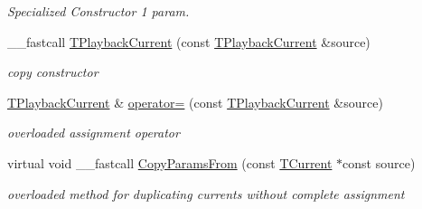 \begin{DoxyCompactItemize}
\begin{DoxyCompactList}\small\item\em Specialized Constructor 1 param. \end{DoxyCompactList}\item 
\hypertarget{class_t_playback_current_a4c38c5735ae6c69d88cab0daab923aec}{\+\_\+\+\_\+fastcall \hyperlink{class_t_playback_current_a4c38c5735ae6c69d88cab0daab923aec}{T\+Playback\+Current} (const \hyperlink{class_t_playback_current}{T\+Playback\+Current} \&source)}\label{class_t_playback_current_a4c38c5735ae6c69d88cab0daab923aec}

\begin{DoxyCompactList}\small\item\em copy constructor \end{DoxyCompactList}\item 
\hypertarget{class_t_playback_current_a24965d14280902d0f3ae98445dcef29f}{\hyperlink{class_t_playback_current}{T\+Playback\+Current} \& \hyperlink{class_t_playback_current_a24965d14280902d0f3ae98445dcef29f}{operator=} (const \hyperlink{class_t_playback_current}{T\+Playback\+Current} \&source)}\label{class_t_playback_current_a24965d14280902d0f3ae98445dcef29f}

\begin{DoxyCompactList}\small\item\em overloaded assignment operator \end{DoxyCompactList}\item 
\hypertarget{class_t_playback_current_a08245f2df509f42674f4c2a1eb5b6cf5}{virtual void \+\_\+\+\_\+fastcall \hyperlink{class_t_playback_current_a08245f2df509f42674f4c2a1eb5b6cf5}{Copy\+Params\+From} (const \hyperlink{class_t_current}{T\+Current} $\ast$const source)}\label{class_t_playback_current_a08245f2df509f42674f4c2a1eb5b6cf5}

\begin{DoxyCompactList}\small\item\em overloaded method for duplicating currents without complete assignment \end{DoxyCompactList}\end{DoxyCompactItemize}
